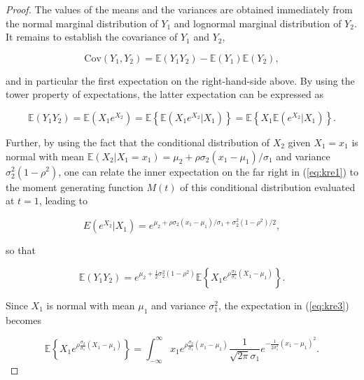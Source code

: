 \documentclass[
]{jss}
\begin{document}
\begin{proof}
The values of the means and the variances are obtained immediately from the normal marginal distribution of $Y_1$ and lognormal marginal distribution of $Y_2$. It remains to establish the covariance of $Y_1$ and $Y_2$, 

\begin{equation}
\label{eq:covy1y2}
\mbox{Cov}(Y_1, Y_2) = \mathbb E(Y_1 Y_2) - \mathbb E(Y_1)\mathbb E(Y_2), 
\end{equation}

and in particular the first expectation on the right-hand-side above. By using the tower property of expectations, the latter expectation can be expressed as 

\begin{equation}
\label{eq:kre1}
\mathbb E(Y_1 Y_2)  =  \mathbb E\left(X_1 e^{X_2}\right)  =  \mathbb E \left\{ \mathbb E \left(X_1 e^{X_2} | X_1 \right) \right\} = \mathbb E \left\{ X_1 \mathbb E \left(e^{X_2} | X_1 \right) \right\}.
\end{equation}

Further, by using the fact that the conditional distribution of $X_2$ given $X_1=x_1$ is normal with mean $\mathbb E(X_2|X_1=x_1) = \mu_2+\rho\sigma_2(x_1-\mu_1)/\sigma_1$ and variance $\sigma_2^2(1-\rho^2)$, one can relate the inner expectation on the far right in (\ref{eq:kre1}) to the moment generating function $M(t)$ of this conditional distribution evaluated at $t=1$, leading to 

\begin{equation}
\label{eq:kre2}
E \left(e^{X_2} | X_1 \right) = e^{ \mu_2+\rho\sigma_2(x_1-\mu_1)/\sigma_1 + \sigma_2^2(1-\rho^2)/2},
\end{equation}

so that 

\begin{equation}
\label{eq:kre3}
\mathbb E(Y_1 Y_2)  =  e^{ \mu_2+ \frac{1}{2} \sigma_2^2(1-\rho^2)} \mathbb E \left\{ X_1 e^{ \rho\frac{\sigma_2}{\sigma_1} (X_1-\mu_1)} \right\}.
\end{equation}

Since $X_1$ is normal with mean $\mu_1$ and variance $\sigma_1^2$, the expectation in (\ref{eq:kre3}) becomes 

\begin{equation}
\label{eq:kre4}
\mathbb E \left\{ X_1 e^{ \rho\frac{\sigma_2}{\sigma_1} (X_1-\mu_1)} \right\} = \int_{-\infty}^\infty x_1 e^{ \rho\frac{\sigma_2}{\sigma_1} (x_1-\mu_1)} \frac{1}{\sqrt{2\pi}\sigma_1} e^{-\frac{1}{2\sigma_1^2}(x_1-\mu_1)^2}.
\end{equation}


\end{proof}
\end{document}
